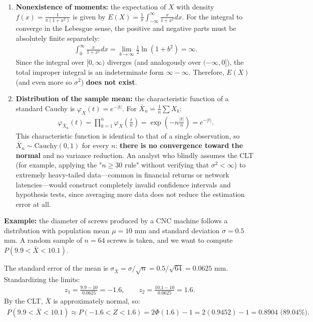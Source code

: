 \begin{solproblema}[prob:293fd20]
	\begin{enumerate}
		\item \textbf{Nonexistence of moments:} the expectation of $X$ with density $f(x) = \frac{1}{\pi(1+x^2)}$ is given by $E(X) = \frac{1}{\pi}\int_{-\infty}^{\infty} \frac{x}{1+x^2}dx$. For the integral to converge in the Lebesgue sense, the positive and negative parts must be absolutely finite separately:
		\begin{align}
			\int_0^{\infty} \frac{x}{1+x^2} dx = \lim_{b \to \infty} \frac{1}{2}\ln(1+b^2) = \infty.
		\end{align}
		Since the integral over $[0,\infty)$ diverges (and analogously over $(-\infty,0]$), the total improper integral is an indeterminate form $\infty - \infty$. Therefore, $E(X)$ (and even more so $\sigma^2$) \textbf{does not exist}.

		\item \textbf{Distribution of the sample mean:} the characteristic function of a standard Cauchy is $\varphi_X(t) = e^{-|t|}$. For $\bar{X}_n = \frac{1}{n}\sum X_k$:
		\begin{align}
			\varphi_{\bar{X}_n}(t) = \prod_{k=1}^n \varphi_X\left(\frac{t}{n}\right) = \exp\left(-n\frac{|t|}{n}\right) = e^{-|t|}.
		\end{align}
		This characteristic function is identical to that of a single observation, so $\bar{X}_n \sim \text{Cauchy}(0,1)$ for every $n$: \textbf{there is no convergence toward the normal} and no variance reduction. An analyst who blindly assumes the CLT (for example, applying the "$n\ge30$ rule" without verifying that $\sigma^2<\infty$) to extremely heavy-tailed data---common in financial returns or network latencies---would construct completely invalid confidence intervals and hypothesis tests, since averaging more data does not reduce the estimation error at all.
	\end{enumerate}
\end{solproblema}

\begin{solproblema}[prob:b7567ec]
	\textbf{Example:} the diameter of screws produced by a CNC machine follows a distribution with population mean $\mu = 10$ mm and standard deviation $\sigma = 0.5$ mm. A random sample of $n = 64$ screws is taken, and we want to compute $P(9.9 < \bar{X} < 10.1)$.

	The standard error of the mean is $\sigma_{\bar{X}} = \sigma/\sqrt{n} = 0.5/\sqrt{64} = 0.0625$ mm. Standardizing the limits:
	\begin{align}
		z_1 = \frac{9.9-10}{0.0625} = -1.6, \qquad z_2 = \frac{10.1-10}{0.0625} = 1.6.
	\end{align}
	By the CLT, $\bar{X}$ is approximately normal, so:
	\begin{align}
		P(9.9 < \bar{X} < 10.1) \approx P(-1.6 < Z < 1.6) = 2\Phi(1.6) - 1 = 2(0.9452) - 1 = 0.8904 \text{ (89.04\%).}
	\end{align}
\end{solproblema}
